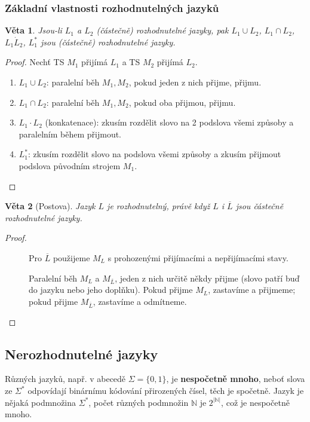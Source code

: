 \documentclass[11pt]{report} %
\newcommand{\N}{\mathbb{N}}
\newtheorem{theorem}{Věta}[section]
\numberwithin{equation}{section}
\begin{document}
\subsubsection{Základní vlastnosti rozhodnutelných jazyků}
\begin{theorem}
Jsou-li $L_1$ a $L_2$ (částečně) rozhodnutelné jazyky, pak $L_1 \cup L_2$, 	$L_1 \cap L_2$, $L_1 \dot L_2$, $L_1^*$ jsou (částečně) rozhodnutelné jazyky.
\end{theorem}
\begin{proof} Nechť TS $M_1$ přijímá $L_1$ a TS $M_2$ přijímá $L_2$.
\begin{enumerate}
	
	
	\item $L_1 \cup L_2$: paralelní běh $M_1, M_2$, pokud jeden z nich přijme, přijmu.
	\item $L_1 \cap L_2$: paralelní běh $M_1, M_2$, pokud oba přijmou, přijmu.
	\item $L_1 \cdot L_2$ (konkatenace): zkusím rozdělit slovo na 2 podslova všemi způsoby a paralelním během přijmout.
	\item $L_1^*$: zkusím rozdělit slovo na podslova všemi způsoby a zkusím přijmout podslova původním strojem $M_1$.
\end{enumerate}
\end{proof}


\begin{theorem}[Postova]
Jazyk $L$ je rozhodnutelný, právě když $L$ i $\overline{L}$ jsou částečně rozhodnutelné jazyky.
\end{theorem}
\begin{proof}~
	\begin{description}
		
		
		\item[\uv{$\Rightarrow$}] Pro $\overline{L}$ použijeme $M_L$ s prohozenými přijímacími a nepřijímacími stavy.
		\item[\uv{$\Leftarrow$}] Paralelní běh $M_L$ a $M_{\overline{L}}$, jeden z nich určitě někdy přijme (slovo patří buď do jazyku nebo jeho doplňku). Pokud přijme $M_L$, zastavíme a přijmeme; pokud přijme $M_{\overline{L}}$, zastavíme a odmítneme.
		
	\end{description}
\end{proof}

\subsection{Nerozhodnutelné jazyky}
Různých jazyků, např. v abecedě $\Sigma = \{0,1\}$, je \textbf{nespočetně mnoho}, neboť slova ze $\Sigma^*$ odpovídají binárnímu kódování přirozených čísel, těch je spočetně. Jazyk je nějaká podmnožina $\Sigma^*$, počet různých podmnožin $\N$ je $2^{|\N|}$, což je nespočetně mnoho.
\end{document}
